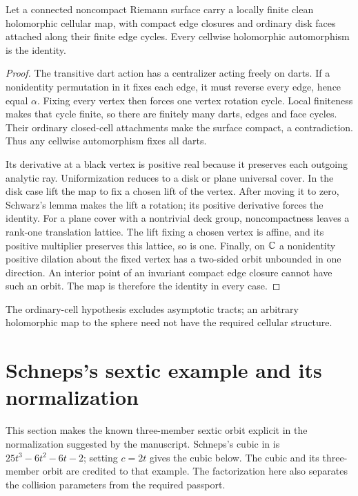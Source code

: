 \begin{proposition}\label{prop:noncompact-cell-rigidity}
Let a connected noncompact Riemann surface carry a locally finite
clean holomorphic cellular map, with compact edge closures and
ordinary disk faces attached along their finite edge cycles.
Every cellwise holomorphic automorphism is the identity.
\end{proposition}
\begin{proof}
The transitive dart action has a centralizer acting freely on darts.
If a nonidentity permutation in it fixes each edge, it must reverse
every edge, hence equal $\alpha$. Fixing every vertex then forces
one vertex rotation cycle. Local finiteness makes that cycle finite,
so there are finitely many darts, edges and face cycles. Their
ordinary closed-cell attachments make the surface compact, a
contradiction. Thus any cellwise automorphism fixes all darts.

Its derivative at a black vertex is positive real because it
preserves each outgoing analytic ray. Uniformization
\cite[Theorem~4.2.1 and the quotient classification, pp.~152--153]{Wendl}
reduces to a disk or plane universal cover. In the disk case lift
the map to fix a chosen lift of the vertex. After moving it to zero,
Schwarz's lemma makes the lift a rotation; its positive derivative
forces the identity. For a plane cover with a nontrivial deck group,
noncompactness leaves a rank-one translation lattice. The lift fixing
a chosen vertex is affine, and its positive multiplier preserves
this lattice, so is one. Finally, on $\mathbb C$ a nonidentity positive
dilation about the fixed vertex has a two-sided orbit unbounded in
one direction. An interior point of an invariant compact edge
closure cannot have such an orbit. The map is therefore the identity
in every case.
\end{proof}
The ordinary-cell hypothesis excludes asymptotic tracts; an arbitrary
holomorphic map to the sphere need not have the required cellular structure.

\section{Schneps's sextic example and its normalization}\label{sec:sextic}
This section makes the known three-member sextic orbit explicit in the
normalization suggested by the manuscript. Schneps's cubic in
\cite[Section~IV, Example~3, pp.~27--28 of the author version]{Schneps}
is $25t^3-6t^2-6t-2$; setting $c=2t$ gives the cubic below.
The cubic and its three-member orbit are credited to that example.
The factorization here also separates the collision parameters from
the required passport.

